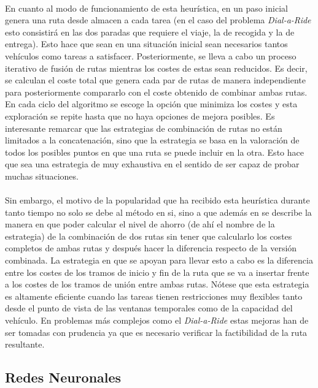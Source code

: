 \documentclass{subfiles}
\begin{document}
        \paragraph{}
        En cuanto al modo de funcionamiento de esta heurística, en un paso inicial genera una ruta desde almacen a cada tarea (en el caso del problema \emph{Dial-a-Ride} esto consistirá en las dos paradas que requiere el viaje, la de recogida y la de entrega). Esto hace que sean en una situación inicial sean necesarios tantos vehículos como tareas a satisfacer. Posteriormente, se lleva a cabo un proceso iterativo de fusión de rutas mientras los costes de estas sean reducidos. Es decir, se calculan el coste total que genera cada par de rutas de manera independiente para posteriormente compararlo con el coste obtenido de combinar ambas rutas. En cada ciclo del algoritmo se escoge la opción que minimiza los costes y esta exploración se repite hasta que no haya opciones de mejora posibles. Es interesante remarcar que las estrategias de combinación de rutas no están limitados a la concatenación, sino que la estrategia se basa en la valoración de todos los posibles puntos en que una ruta se puede incluir en la otra. Esto hace que sea una estrategia de muy exhaustiva en el sentido de ser capaz de probar muchas situaciones.

        \paragraph{}
        Sin embargo, el motivo de la popularidad que ha recibido esta heurística durante tanto tiempo no solo se debe al método en si, sino a que además en \cite{clarke1964scheduling} se describe la manera en que poder calcular el nivel de ahorro (de ahí el nombre de la estrategia) de la combinación de dos rutas sin tener que calcularlo los costes completos de ambas rutas y después hacer la diferencia respecto de la versión combinada. La estrategia en que se apoyan para llevar esto a cabo es la diferencia entre los costes de los tramos de inicio y fin de la ruta que se va a insertar frente a los costes de los tramos de unión entre ambas rutas. Nótese que esta estrategia es altamente eficiente cuando las tareas tienen restricciones muy flexibles tanto desde el punto de vista de las ventanas temporales como de la capacidad del vehículo. En problemas más complejos como el \emph{Dial-a-Ride} estas mejoras han de ser tomadas con prudencia ya que es necesario verificar la factibilidad de la ruta resultante.

      \subsection{Redes Neuronales}
      \label{sec:solving_neural_networks}
\end{document}
